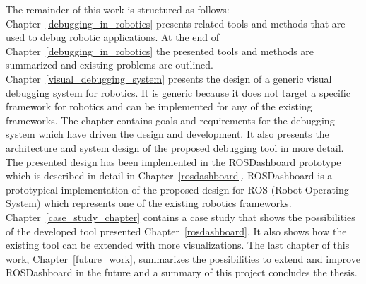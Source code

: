 The remainder of this work is structured as follows: Chapter~\ref{debugging_in_robotics} presents related tools and methods that are used to debug robotic applications. At the end of Chapter~\ref{debugging_in_robotics} the presented tools and methods are summarized and existing problems are outlined. Chapter~\ref{visual_debugging_system} presents the design of a generic visual debugging system for robotics. It is generic because it does not target a specific framework for robotics and can be implemented for any of the existing frameworks. The chapter contains goals and requirements for the debugging system which have driven the design and development. It also presents the architecture and system design of the proposed debugging tool in more detail. The presented design has been implemented in the ROSDashboard prototype which is described in detail in Chapter~\ref{rosdashboard}. ROSDashboard is a prototypical implementation of the proposed design for ROS (Robot Operating System) which represents one of the existing robotics frameworks. Chapter~\ref{case_study_chapter} contains a case study that shows the possibilities of the developed tool presented Chapter~\ref{rosdashboard}. It also shows how the existing tool can be extended with more visualizations. The last chapter of this work, Chapter~\ref{future_work}, summarizes the possibilities to extend and improve ROSDashboard in the future and a summary of this project concludes the thesis.
